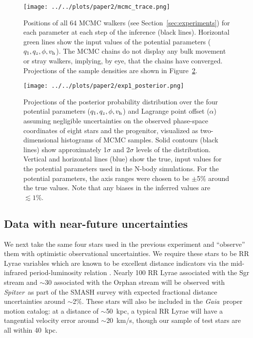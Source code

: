 \documentclass[letterpaper,12pt,preprint]{aastex}
\newcommand{\project}[1]{\textsl{#1}}
\newcommand{\gaia}{\project{Gaia}}
\newcommand{\spitzer}{\project{Spitzer}~}
\newcommand{\vhalo}{v_{\rm h}}
\newcommand{\potp}{$q_1,q_z,\phi,\vhalo$}
\begin{document}
\begin{figure}[!h]
\begin{center}
\texttt{[image: ../../plots/paper2/mcmc\_trace.png]}
\caption{ Positions of all 64 MCMC walkers (see Section~\ref{sec:experiments}) for each parameter at each step of the inference (black lines). Horizontal green lines show the input values of the potential parameters (\potp). The MCMC chains do not display any bulk movement or stray walkers, implying, by eye, that the chains have converged. Projections of the sample densities are shown in Figure~\ref{fig:exp1_posterior}. }\label{fig:trace}
\end{center}
\end{figure}

\begin{figure*}[!h]
\begin{center}
\texttt{[image: ../../plots/paper2/exp1\_posterior.png]}
\caption{ Projections of the posterior probability distribution over the four potential parameters (\potp) and Lagrange point offset ($\alpha$) assuming negligible uncertainties on the observed phase-space coordinates of eight stars and the progenitor, visualized as two-dimensional histograms of MCMC samples. Solid contours (black lines) show approximately 1$\sigma$ and 2$\sigma$ levels of the distribution. Vertical and horizontal lines (blue) show the true, input values for the potential parameters used in the N-body simulations. For the potential parameters, the axis ranges were chosen to be $\pm$5\% around the true values. Note that any biases in the inferred values are $\lesssim1\%$. }\label{fig:exp1_posterior}
\end{center}
\end{figure*}

\subsection{Data with near-future uncertainties}\label{sec:exp2}
We next take the same four stars used in the previous experiment and ``observe'' them with optimistic observational uncertainties. We require these stars to be RR Lyrae variables which are known to be excellent distance indicators via the mid-infrared period-luminosity relation \citep[as shown in, e.g.,][]{madore12}. Nearly 100 RR Lyrae associated with the Sgr stream and $\sim$30 associated with the Orphan stream will be observed with \spitzer as part of the SMASH survey \citep{smashprop} with expected fractional distance uncertainties around $\sim$2\%. These stars will also be included in the \gaia\, proper motion catalog: at a distance of $\sim$50~kpc, a typical RR Lyrae will have a tangential velocity error around $\sim$20~km/s, though our sample of test stars are all within 40~kpc.
\end{document}
